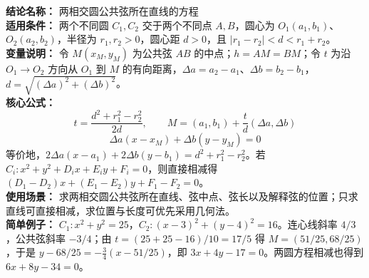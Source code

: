 \textbf{结论名称：} 两相交圆公共弦所在直线的方程\\
\textbf{适用条件：} 两个不同圆 $C_1,C_2$ 交于两个不同点 $A,B$，圆心为 $O_1(a_1,b_1)$、$O_2(a_2,b_2)$，半径为 $r_1,r_2>0$，圆心距 $d>0$，且 $|r_1-r_2|<d<r_1+r_2$。\\
\textbf{变量说明：} 令 $M(x_M,y_M)$ 为公共弦 $AB$ 的中点；$h=AM=BM$；令 $t$ 为沿 $O_1\to O_2$ 方向从 $O_1$ 到 $M$ 的有向距离，$\Delta a=a_2-a_1$、$\Delta b=b_2-b_1$，$d=\sqrt{(\Delta a)^2+(\Delta b)^2}$。\\
\textbf{核心公式：}
\[
\boxed{t=\frac{d^2+r_1^2-r_2^2}{2d}},\qquad
\boxed{M=(a_1,b_1)+\frac{t}{d}(\Delta a,\Delta b)}
\]
\[
\boxed{\Delta a(x-x_M)+\Delta b(y-y_M)=0}
\]
等价地，$\boxed{2\Delta a(x-a_1)+2\Delta b(y-b_1)=d^2+r_1^2-r_2^2}$。若 $C_i:x^2+y^2+D_ix+E_iy+F_i=0$，则直接相减得 $\boxed{(D_1-D_2)x+(E_1-E_2)y+F_1-F_2=0}$。\\
\textbf{使用场景：} 求两相交圆公共弦所在直线、弦中点、弦长以及解释弦的位置；只求直线可直接相减，求位置与长度可优先采用几何法。\\
\textbf{简单例子：} $C_1:x^2+y^2=25$，$C_2:(x-3)^2+(y-4)^2=16$。连心线斜率 $4/3$，公共弦斜率 $-3/4$；由 $t=(25+25-16)/10=17/5$ 得 $M=(51/25,68/25)$，于是 $y-68/25=-\frac34(x-51/25)$，即 $\boxed{3x+4y-17=0}$。两圆方程相减也得到 $6x+8y-34=0$。
